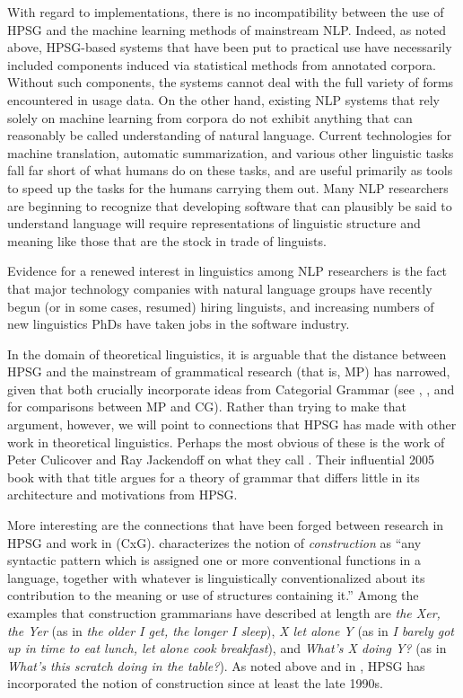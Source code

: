 \documentclass[output=paper]{langsci/langscibook}
\begin{document}
With regard to implementations, there is no incompatibility between the use of HPSG and the machine learning methods of mainstream NLP.  Indeed, as noted above, HPSG-based systems that have been put to practical use have necessarily included components induced via statistical methods from annotated corpora.  Without such components, the systems cannot deal with the full variety of forms encountered in usage data.  On the other hand, existing NLP systems that rely solely on machine learning from corpora do not exhibit anything that can reasonably be called understanding of natural language.  Current technologies for machine translation, automatic summarization, and various other linguistic tasks fall far short of what humans do on these tasks, and are useful primarily as tools to speed up the tasks for the humans carrying them out.  Many NLP researchers are beginning to recognize that developing software that can plausibly be said to understand language will require representations of linguistic structure and meaning like those that are the stock in trade of linguists.

Evidence for a renewed interest in linguistics among NLP researchers is the fact that major technology companies with natural language groups have recently begun (or in some cases, resumed) hiring linguists, and increasing numbers of new linguistics PhDs have taken jobs in the software industry.  

In the domain of theoretical linguistics, it is arguable that the distance between HPSG and the mainstream of grammatical research (that is, MP) has narrowed, given that both crucially incorporate ideas from Categorial Grammar (see \citet{RetStab2004}, \citet{BE95a}, and \citet{MuellerUnifying} for comparisons between MP and CG). Rather than trying to make that argument, however, we will point to connections that HPSG has made with other work in theoretical linguistics.  Perhaps the most obvious of these is the work of Peter Culicover and Ray Jackendoff on what they call {\em{}}.  Their influential 2005 book with that title \citep{CJ2005a} argues for a theory of grammar that differs little in its architecture and motivations from HPSG.

More interesting are the connections that have been forged between research in HPSG and work in  (CxG).  \citet[]{Fillmore88a} characterizes the notion  of \emph{construction} as ``any syntactic pattern which is assigned one or more conventional functions in a language, together with whatever is linguistically conventionalized about its contribution to the meaning or use of structures containing it.''  Among the examples that construction grammarians have described at length are \emph{the Xer, the Yer} (as in \emph{the older I get, the longer I sleep}), \emph{X let alone Y} (as in \emph{I barely got up in time to eat lunch, let alone cook breakfast}), and \emph{What's X doing Y?} (as in \emph{What's this scratch doing in the table?}).  As noted above and in , HPSG has incorporated the notion of construction since at least the late 1990s.  
\end{document}
